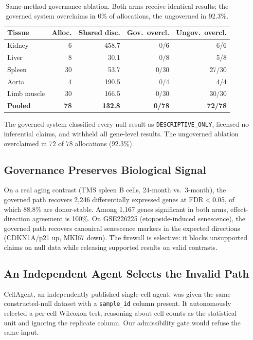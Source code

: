 \documentclass[11pt]{article}
\begin{document}
\begin{table}[h]
\centering
\begin{tabular}{lrrrr}
\toprule
\textbf{Tissue} & \textbf{Alloc.} & \textbf{Shared disc.} & \textbf{Gov.\ overcl.} & \textbf{Ungov.\ overcl.} \\
\midrule
Kidney      & 6  & 458.7 & 0/6  & 6/6  \\
Liver       & 8  & 30.1  & 0/8  & 5/8  \\
Spleen      & 30 & 53.7  & 0/30 & 27/30 \\
Aorta       & 4  & 190.5 & 0/4  & 4/4  \\
Limb muscle & 30 & 166.5 & 0/30 & 30/30 \\
\midrule
\textbf{Pooled} & \textbf{78} & \textbf{132.8} & \textbf{0/78} & \textbf{72/78} \\
\bottomrule
\end{tabular}
\caption{Same-method governance ablation. Both arms receive identical results;
the governed system overclaims in 0\% of allocations, the ungoverned in
92.3\%.}
\end{table}

The governed system classified every null result as
\texttt{DESCRIPTIVE\_ONLY}, licensed no inferential claims, and withheld all
gene-level results. The ungoverned ablation overclaimed in 72 of 78
allocations (92.3\%).

\subsection{Governance Preserves Biological Signal}

On a real aging contrast (TMS spleen B cells, 24-month vs.\ 3-month), the
governed path recovers 2,246 differentially expressed genes at FDR$<$0.05, of
which 88.8\% are donor-stable. Among 1,167 genes significant in both arms,
effect-direction agreement is 100\%. On GSE226225 (etoposide-induced
senescence), the governed path recovers canonical senescence markers in the
expected directions (CDKN1A/p21 up, MKI67 down). The firewall is selective:
it blocks unsupported claims on null data while releasing supported results on
valid contrasts.

\subsection{An Independent Agent Selects the Invalid Path}

CellAgent, an independently published single-cell agent, was given the same
constructed-null dataset with a \texttt{sample\_id} column present. It
autonomously selected a per-cell Wilcoxon test, reasoning about cell counts as
the statistical unit and ignoring the replicate column. Our admissibility gate
would refuse the same input.


\end{document}
